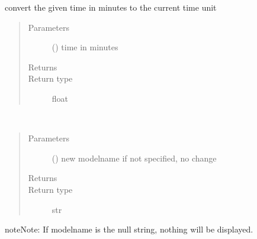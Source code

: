 \documentclass[letterpaper,10pt,english]{sphinxmanual}
\begin{document}
\begin{fulllineitems}
\begin{fulllineitems}
\end{fulllineitems}


\begin{fulllineitems}
\label{\detokenize{Reference:salabim.Environment.minutes}}
convert the given time in minutes to the current time unit
\begin{quote}\begin{description}
\item[{Parameters}] \leavevmode
{} () \textendash{} time in minutes

\item[{Returns}] \leavevmode
{}

\item[{Return type}] \leavevmode
float

\end{description}\end{quote}

\end{fulllineitems}


\begin{fulllineitems}
\label{\detokenize{Reference:salabim.Environment.modelname}}~\begin{quote}\begin{description}
\item[{Parameters}] \leavevmode
{} () \textendash{} new modelname 
if not specified, no change

\item[{Returns}] \leavevmode
{}

\item[{Return type}] \leavevmode
str

\end{description}\end{quote}

\begin{sphinxadmonition}{note}{Note:}
If modelname is the null string, nothing will be displayed.
\end{sphinxadmonition}


\end{fulllineitems}
\end{fulllineitems}
\end{document}
